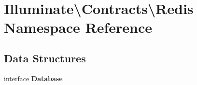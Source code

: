 \section{Illuminate\textbackslash{}Contracts\textbackslash{}Redis Namespace Reference}
\label{namespace_illuminate_1_1_contracts_1_1_redis}
\subsection*{Data Structures}
\begin{DoxyCompactItemize}
\item 
interface {\bf Database}
\end{DoxyCompactItemize}
